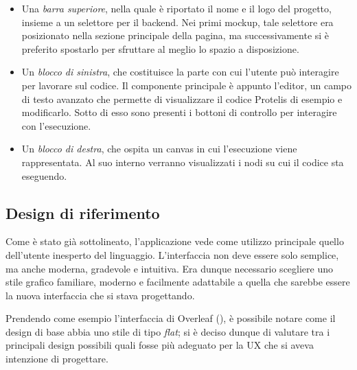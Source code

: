       \begin{itemize}
        \item
          Una \emph{barra superiore}, nella quale è riportato il nome e il logo del progetto, insieme a un selettore per il backend.
          Nei primi mockup, tale selettore era posizionato nella sezione principale della pagina, ma successivamente si è preferito spostarlo per sfruttare al meglio lo spazio a disposizione.
        \item
          Un \emph{blocco di sinistra}, che costituisce la parte con cui l'utente può interagire per lavorare sul codice.
          Il componente principale è appunto l'editor, un campo di testo avanzato che permette di visualizzare il codice Protelis di esempio e modificarlo.
          Sotto di esso sono presenti i bottoni di controllo per interagire con l'esecuzione.
        \item
          Un \emph{blocco di destra}, che ospita un canvas in cui l'esecuzione viene rappresentata.
          Al suo interno verranno visualizzati i nodi su cui il codice sta eseguendo.
      \end{itemize}

    \subsection{Design di riferimento}\label{subsec:material}
      Come è stato già sottolineato, l'applicazione vede come utilizzo principale quello dell'utente inesperto del linguaggio.
      L'interfaccia non deve essere solo semplice, ma anche moderna, gradevole e intuitiva.
      Era dunque necessario scegliere uno stile grafico familiare, moderno e facilmente adattabile a quella che sarebbe essere la nuova interfaccia che si stava progettando.

      Prendendo come esempio l'interfaccia di Overleaf (), è possibile notare come il design di base abbia uno stile di tipo \emph{flat};
      si è deciso dunque di valutare tra i principali design possibili quali fosse più adeguato per la UX che si aveva intenzione di progettare.

